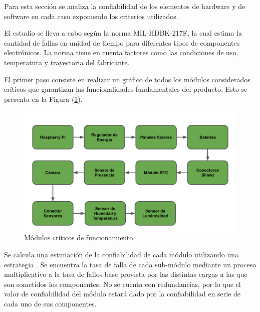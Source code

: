 %

%

Para esta sección se analiza la confiabilidad de los elementos de hardware y de software en cada caso exponiendo los criterios utilizados.

El estudio se lleva a cabo según la norma MIL-HDBK-217F, la cual estima la cantidad de fallas en unidad de tiempo para diferentes tipos de componentes electrónicos. La norma tiene en cuenta factores como las condiciones de uso, temperatura y trayectoria del fabricante.

El primer paso consiste en realizar un gráfico de todos los módulos considerados críticos que garantizan las funcionalidades fundamentales del producto. Esto se presenta en la Figura (\ref{fig:criticos}).

\begin{figure}[H]
	\centering
	\includegraphics[width=0.9\linewidth,page=1]{ImagenesEstudios/ModulosCriticos}		
	\caption{Módulos críticos de funcionamiento.}
	\label{fig:criticos}
\end{figure}
Se calcula una estimación de la confiabilidad de cada módulo utilizando una estrategia . Se encuentra la tasa de falla de cada sub-módulo mediante un proceso multiplicativo a la tasa de fallos base provista por las distintas cargas a las que son sometidos los componentes.
No se cuenta con redundancias, por lo que el valor de confiabilidad del módulo estará dado por la confiabilidad en serie de cada uno de sus componentes.


